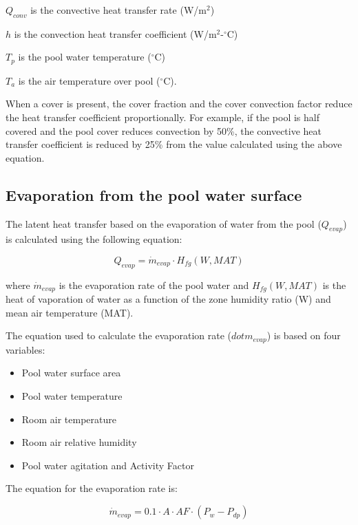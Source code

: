 \(Q_{conv}\) is the convective heat transfer rate (W/m\(^2\))

\(h\) is the convection heat transfer coefficient (W/m\(^2\)-\(^{\circ}\)C)

\(T_p\) is the pool water temperature (\(^{\circ}\)C)

\(T_a\) is the air temperature over pool (\(^{\circ}\)C).

When a cover is present, the cover fraction and the cover convection factor reduce the heat transfer coefficient proportionally. For example, if the pool is half covered and the pool cover reduces convection by 50\%, the convective heat transfer coefficient is reduced by 25\% from the value calculated using the above equation.

\subsection{Evaporation from the pool water surface}\label{evaporation-from-the-pool-water-surface}

The latent heat transfer based on the evaporation of water from the pool (\(Q_{evap}\)) is calculated using the following equation:

\begin{equation}
Q_{evap} = \dot{m}_{evap} \cdot H_{fg}(W,MAT)
\end{equation}

where \(\dot{m}_{evap}\) is the evaporation rate of the pool water and \(H_{fg}(W,MAT)\) is the heat of vaporation of water as a function of the zone humidity ratio (W) and mean air temperature (MAT).

The equation used to calculate the evaporation rate (\(dot{m}_{evap}\)) is based on four variables:

\begin{itemize}
\tightlist
\item
  Pool water surface area
\item
  Pool water temperature
\item
  Room air temperature
\item
  Room air relative humidity
\item
  Pool water agitation and Activity Factor
\end{itemize}

The equation for the evaporation rate is:

\begin{equation}
\dot{m}_{evap} = 0.1 \cdot A \cdot AF \cdot (P_w - P_{dp})
\end{equation}

